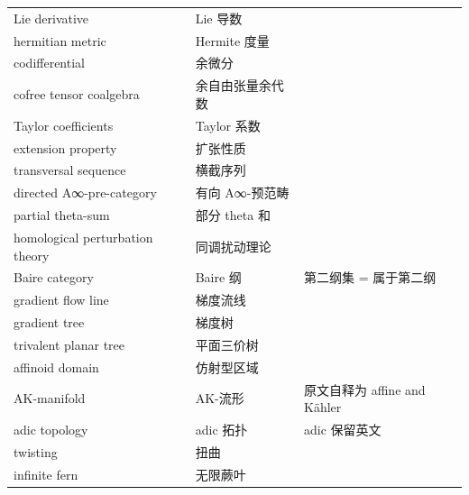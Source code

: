 \begin{longtable}{@{}p{}p{}p{}@{}}
Lie derivative & Lie 导数 &  \\
hermitian metric & Hermite 度量 &  \\
codifferential & 余微分 &  \\
cofree tensor coalgebra & 余自由张量余代数 &  \\
Taylor coefficients & Taylor 系数 &  \\
extension property & 扩张性质 &  \\
transversal sequence & 横截序列 &  \\
directed A∞-pre-category & 有向 A∞-预范畴 &  \\
partial theta-sum & 部分 theta 和 &  \\
homological perturbation theory & 同调扰动理论 &  \\
Baire category & Baire 纲 & 第二纲集 = 属于第二纲 \\
gradient flow line & 梯度流线 &  \\
gradient tree & 梯度树 &  \\
trivalent planar tree & 平面三价树 &  \\
affinoid domain & 仿射型区域 &  \\
AK-manifold & AK-流形 & 原文自释为 affine and Kähler \\
adic topology & adic 拓扑 & adic 保留英文 \\
twisting & 扭曲 &  \\
infinite fern & 无限蕨叶 &  \\
\end{longtable}
\endgroup
